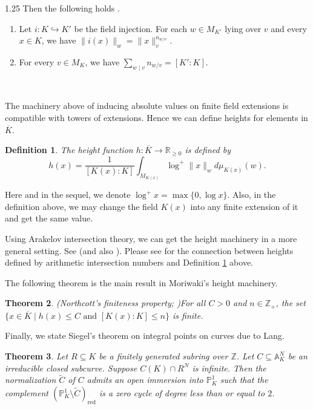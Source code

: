 \documentclass[12pt]{article}
\newtheorem{definition}{Definition}[section]
\newtheorem{theorem}[definition]{Theorem}
\begin{document}
\begin{spacing}{1.25}
Then the following holds \cite[Proposition 3.11]{Voj21}.
\begin{enumerate}
\item
Let $i\colon K\hookrightarrow K'$ be the field injection. For each $w\in M_{K'}$ lying over $v$ and every $x\in K$, we have $\|i(x)\|_w=\|x\|_v^{n_{w/v}}$.
\item
For every $v\in M_K$, we have $\sum\limits_{w\mid v}n_{w/v}=[K':K]$.
\end{enumerate}

~

The machinery above of inducing absolute values on finite field extensions is compatible with towers of extensions. Hence we can define heights for elements in $\overline{K}$.

\begin{definition}\label{height}
The \emph{height function} $h\colon\overline{K}\to\mathbb{R}_{\geq0}$ is defined by
$$h(x)=\frac{1}{[K(x):K]}\int_{M_{K(x)}}\log^+\|x\|_wd\mu_{K(x)}(w).$$
\end{definition}

Here and in the sequel, we denote $\log^{+}x=\max\{0,\log x\}$. Also, in the definition above, we may change the field $K(x)$ into any finite extension of it and get the same value.

Using Arakelov intersection theory, we can get the height machinery in a more general setting. See \cite[Section 3.3]{Mor00} (and also \cite[Definition 3.14]{Voj21}). Please see \cite[Proposition 3.3.2]{Mor00} for the connection between heights defined by arithmetic intersection numbers and Definition \ref{height} above.

The following theorem is the main result in Moriwaki's height machinery.

\begin{theorem}(Northcott's finiteness property; \cite[Theorem 4.3]{Mor00})\label{northcott}
For all $C>0$ and $n\in\mathbb{Z}_+$, the set $\{x\in\overline{K}\mid h(x)\leq C\text{ and }[K(x):K]\leq n\}$ is finite.
\end{theorem}

Finally, we state Siegel's theorem on integral points on curves due to Lang.

\begin{theorem}\label{siegel}
Let $R\subseteq K$ be a finitely generated subring over $\mathbb{Z}$. Let $C\subseteq\mathbb{A}_K^N$ be an irreducible closed subcurve. Suppose $C(K)\cap R^N$ is infinite. Then the normalization $\widetilde{C}$ of $C$ admits an open immersion into $\mathbb{P}_K^1$ such that the complement $(\mathbb{P}_K^1\setminus\widetilde{C})_{\mathrm{red}}$ is a zero cycle of degree less than or equal to $2$.
\end{theorem}


\end{spacing}
\end{document}
